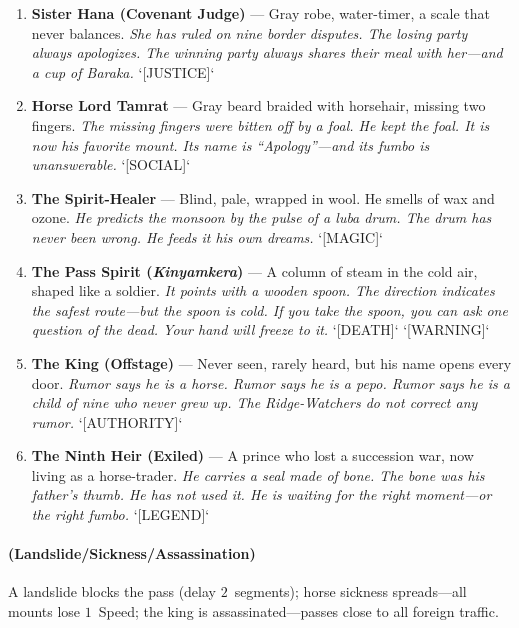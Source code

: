 \begin{enumerate}
\item \textbf{Sister Hana (Covenant Judge)} --- Gray robe, water-timer, a scale that never balances.
  \hfill \textit{She has ruled on nine border disputes. The losing party always apologizes. The winning party always shares their meal with her---and a cup of \textit{Baraka}.} `[JUSTICE]`
\item \textbf{Horse Lord Tamrat} --- Gray beard braided with horsehair, missing two fingers.
  \hfill \textit{The missing fingers were bitten off by a foal. He kept the foal. It is now his favorite mount. Its name is ``Apology''---and its \textit{fumbo} is unanswerable.} `[SOCIAL]`
\item[J] \textbf{The Spirit-Healer} --- Blind, pale, wrapped in wool. He smells of wax and ozone.
  \hfill \textit{He predicts the monsoon by the pulse of a \textit{luba} drum. The drum has never been wrong. He feeds it his own dreams.} `[MAGIC]`
\item[Q] \textbf{The Pass Spirit (\textit{Kinyamkera})} --- A column of steam in the cold air, shaped like a soldier.
  \hfill \textit{It points with a wooden spoon. The direction indicates the safest route---but the spoon is cold. If you take the spoon, you can ask one question of the dead. Your hand will freeze to it.} `[DEATH]` `[WARNING]`
\item[K] \textbf{The King (Offstage)} --- Never seen, rarely heard, but his name opens every door.
  \hfill \textit{Rumor says he is a horse. Rumor says he is a \textit{pepo}. Rumor says he is a child of nine who never grew up. The Ridge-Watchers do not correct any rumor.} `[AUTHORITY]`
\item[A] \textbf{The Ninth Heir (Exiled)} --- A prince who lost a succession war, now living as a horse-trader.
  \hfill \textit{He carries a seal made of bone. The bone was his father's thumb. He has not used it. He is waiting for the right moment---or the right \textit{fumbo}.} `[LEGEND]`
\end{enumerate}

\paragraph*{(Landslide/Sickness/Assassination)} A landslide blocks the pass (delay $2$~segments); horse sickness spreads---all mounts lose $1$~Speed; the king is assassinated---passes close to all foreign traffic.

